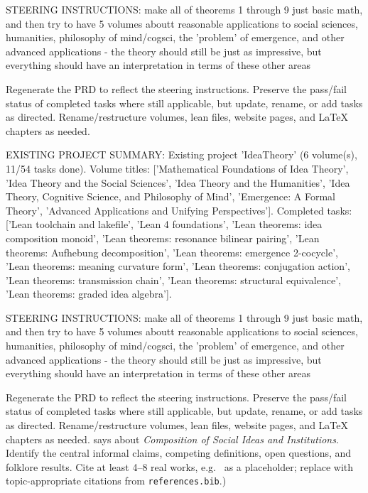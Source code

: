 STEERING INSTRUCTIONS: make all of theorems 1 through 9 just basic math, and then try to have 5 volumes aboutt reasonable applications to social sciences, humanities, philosophy of mind/cogsci, the 'problem' of emergence, and other advanced applications - the theory should still be just as impressive, but everything should have an interpretation in terms of these other areas

Regenerate the PRD to reflect the steering instructions. Preserve the pass/fail status of completed tasks where still applicable, but update, rename, or add tasks as directed. Rename/restructure volumes, lean files, website pages, and LaTeX chapters as needed.

EXISTING PROJECT SUMMARY: Existing project 'IdeaTheory' (6 volume(s), 11/54 tasks done). Volume titles: ['Mathematical Foundations of Idea Theory', 'Idea Theory and the Social Sciences', 'Idea Theory and the Humanities', 'Idea Theory, Cognitive Science, and Philosophy of Mind', 'Emergence: A Formal Theory', 'Advanced Applications and Unifying Perspectives']. Completed tasks: ['Lean toolchain and lakefile', 'Lean 4 foundations', 'Lean theorems: idea composition monoid', 'Lean theorems: resonance bilinear pairing', 'Lean theorems: Aufhebung decomposition', 'Lean theorems: emergence 2-cocycle', 'Lean theorems: meaning curvature form', 'Lean theorems: conjugation action', 'Lean theorems: transmission chain', 'Lean theorems: structural equivalence', 'Lean theorems: graded idea algebra'].

STEERING INSTRUCTIONS: make all of theorems 1 through 9 just basic math, and then try to have 5 volumes aboutt reasonable applications to social sciences, humanities, philosophy of mind/cogsci, the 'problem' of emergence, and other advanced applications - the theory should still be just as impressive, but everything should have an interpretation in terms of these other areas

Regenerate the PRD to reflect the steering instructions. Preserve the pass/fail status of completed tasks where still applicable, but update, rename, or add tasks as directed. Rename/restructure volumes, lean files, website pages, and LaTeX chapters as needed. says about \emph{Composition of Social Ideas and Institutions}.  Identify the
        central informal claims, competing definitions, open questions, and
        folklore results.  Cite at least 4--8 real works, e.g.\ \cite{
        lean4_tpil} as a placeholder; replace with topic-appropriate
        citations from \texttt{references.bib}.)

